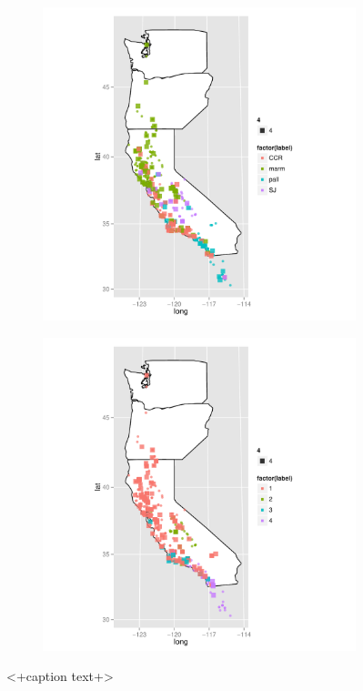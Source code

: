 \documentclass{article}\usepackage{graphicx, color}
\begin{document}
\begin{figure}[t]
  \begin{subfigure}[b]{0.5\textwidth}
    \centering
    \caption{}
    \includegraphics[width = \textwidth]{figure/nnet-map3}
    \label{fig:nnet-map3}
  \end{subfigure}%
  \begin{subfigure}[b]{0.5\textwidth}
    \centering
    \caption{}
    \includegraphics[width = \textwidth]{figure/nnet-map4}
    \label{fig:nnet-map4}
  \end{subfigure}
  \caption{<+caption text+>}
  \label{fig:nnet-map}
\end{figure}
\end{document}
